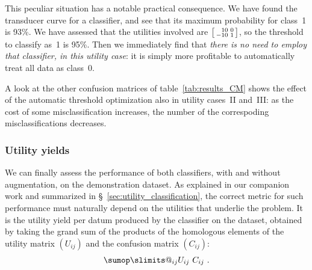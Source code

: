 \documentclass[\ifafour a4paper,12pt,\else a5paper,10pt,\fi%
onecolumn,oneside,article,%
british%
]{memoir}
\makeatletter
\theoremstyle{remark}
\theoremstyle{innote}
\def\sum{\DOTSI\sumop\slimits@}
\renewcommand*{\|}[1][]{\nonscript\:#1\vert\nonscript\:\mathopen{}}
\newcommand*{\sect}{\S}%
\newcommand*{\sumatrix}[4]{\begin{bsmallmatrix*}[r]#1&#2\\#3&#4\end{bsmallmatrix*}}
\makeatother
\begin{document}
This peculiar situation has a notable practical consequence. We have found the transducer curve for a classifier, and see that its maximum probability for class~1 is 93\%. We have assessed that the utilities involved are $\sumatrix{10}{0}{-10}{1}$, so the threshold to classify as~1 is 95\%. Then we immediately find that \emph{there is no need to employ that classifier, in this utility case}: it is simply more profitable to automatically treat all data as class~0.

\medskip

A look at the other confusion matrices of table~\ref{tab:results_CM} shows the effect of the automatic threshold optimization also in utility cases~II and~III: as the cost of some misclassification increases, the number of the correspoding misclassifications decreases.


\subsubsection{Utility yields}

We can finally assess the performance of both classifiers, with and without augmentation, on the demonstration dataset. As explained in our companion work \autocites{dyrlandetal2022} and summarized in \sect~\ref{sec:utility_classification}, the correct metric for such performance must naturally depend on the utilities that underlie the problem. It is the utility yield per datum produced by the classifier on the dataset, obtained by taking the grand sum of the products of the homologous elements of the utility matrix $(U_{ij})$ and the confusion matrix $(C_{ij})$:
\begin{equation}
  \label{eq:performance_metric}
  \sum_{ij} U_{ij}\ C_{ij} \ .
\end{equation}




\end{document}
